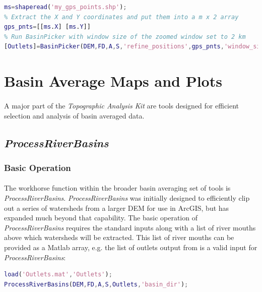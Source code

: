 \begin{lstlisting}[language=Matlab]
% Load a shapefile containing your GPS coordinates
ms=shaperead('my_gps_points.shp');
% Extract the X and Y coordinates and put them into a m x 2 array
gps_pnts=[[ms.X] [ms.Y]]
% Run BasinPicker with window size of the zoomed window set to 2 km
[Outlets]=BasinPicker(DEM,FD,A,S,'refine_positions',gps_pnts,'window_size',2);
\end{lstlisting}

\section{Basin Average Maps and Plots}

\paragraph{}A major part of the \textit{Topographic Analysis Kit} are tools designed for efficient selection and analysis of basin averaged data.

\subsection{\textit{ProcessRiverBasins}} \label{sec:PrcRvBsn}

\subsubsection{Basic Operation}
\paragraph{}The workhorse function within the broader basin averaging set of tools is \textit{ProcessRiverBasins}. \textit{ProcessRiverBasins} was initially designed to efficiently clip out a series of watersheds from a larger DEM for use in ArcGIS, but has expanded much beyond that capability. The basic operation of \textit{ProcessRiverBasins} requires the standard inputs along with a list of river mouths above which watersheds will be extracted. This list of river mouths can be provided as a Matlab array, e.g. the list of outlets output from  is a valid input for \textit{ProcessRiverBasins}:

\begin{lstlisting}[language=Matlab]
% Using output of BasinPicker to run ProcessRiverBasins
load('Outlets.mat','Outlets');
ProcessRiverBasins(DEM,FD,A,S,Outlets,'basin_dir');
\end{lstlisting}

